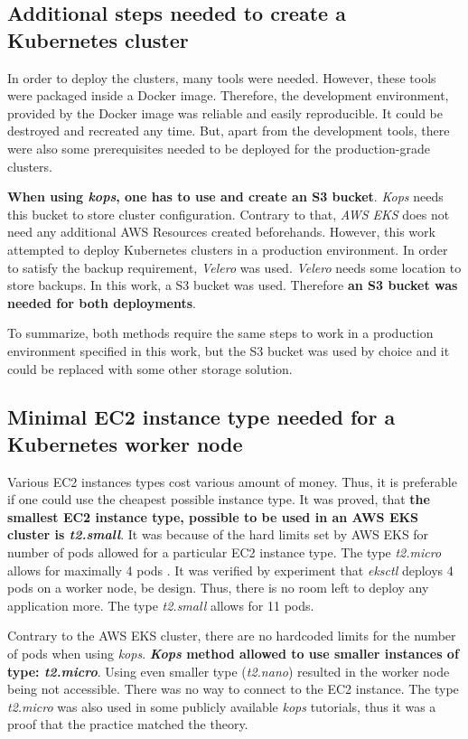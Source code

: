\subsection{Additional steps needed to create a Kubernetes cluster}
In order to deploy the clusters, many tools were needed. However, these tools were packaged inside a Docker image. Therefore, the development environment, provided by the Docker image was reliable and easily reproducible. It could be destroyed and recreated any time. But, apart from the development tools, there were also some prerequisites needed to be deployed for the production-grade clusters.

\textbf{When using \textit{kops}, one has to use and create an S3 bucket}. \textit{Kops} needs this bucket to store cluster configuration. Contrary to that, \textit{AWS EKS} does not need any additional AWS Resources created beforehands. However, this work attempted to deploy Kubernetes clusters in a production environment. In order to satisfy the backup requirement, \textit{Velero} was used. \textit{Velero} needs some location to store backups. In this work, a S3 bucket was used. Therefore \textbf{an S3 bucket was needed for both deployments}.

To summarize, both methods require the same steps to work in a production environment specified in this work, but the S3 bucket was used by choice and it could be replaced with some other storage solution.

\subsection{Minimal EC2 instance type needed for a Kubernetes worker node}
Various EC2 instances types cost various amount of money. Thus, it is preferable if one could use the cheapest possible instance type. It was proved, that \textbf{the smallest EC2 instance type, possible to be used in an AWS EKS cluster is \textit{t2.small}}. It was because of the hard limits set by AWS EKS for number of pods allowed for a particular EC2 instance type. The type \textit{t2.micro} allows for maximally 4 pods \cite{eks-hard-limits}. It was verified by experiment that \textit{eksctl} deploys 4 pods on a worker node, be design. Thus, there is no room left to deploy any application more. The type \textit{t2.small} allows for 11 pods.

Contrary to the AWS EKS cluster, there are no hardcoded limits for the number of pods when using \textit{kops}. \textbf{\textit{Kops} method allowed to use smaller instances of type: \textit{t2.micro}}. Using even smaller type (\textit{t2.nano}) resulted in the worker node being not accessible. There was no way to connect to the EC2 instance. The type \textit{t2.micro} was also used in some publicly available \textit{kops} tutorials, thus it was a proof that the practice matched the theory.

